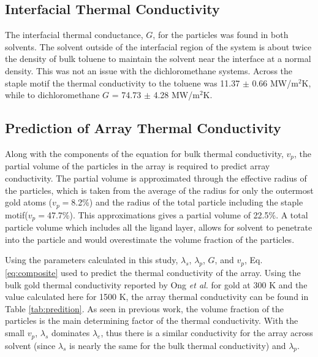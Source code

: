 \subsection{Interfacial Thermal Conductivity}
The interfacial thermal conductance, $G$, for the particles was found in both solvents.
The solvent outside of the interfacial region of the system is about twice the density of bulk toluene to maintain the solvent near the interface at a normal density.
This was not an issue with the dichloromethane systems. 
Across the staple motif the thermal conductivity to the toluene was 11.37 $\pm$ 0.66 MW/m$^2$K, while to dichloromethane $G$ = 74.73 $\pm$ 4.28 MW/m$^2$K.

\subsection{Prediction of Array Thermal Conductivity}
Along with the components of the equation for bulk thermal conductivity, $v_p$, the partial volume of the  particles in the array is required to predict array conductivity.
The partial volume is approximated through the effective radius of the particles, which is taken from the average of the radius for only the outermost gold atoms ($v_p=$8.2\%) and the radius of the total particle including the staple motif($v_p=$47.7\%).
This approximations gives a partial volume of 22.5\%.
A total particle volume which includes all the ligand layer, allows for solvent to penetrate into the particle and would overestimate the volume fraction of the particles. %

Using the parameters calculated in this study, $\lambda_s$, $\lambda_p$, $G$, and $v_p$, Eq.\ref{eq:composite} used to predict the thermal conductivity of the array.
Using the bulk gold thermal conductivity reported by Ong \textit{et al.} for gold at 300 K and the value calculated here for 1500 K, the array thermal conductivity can be found in Table \ref{tab:predition}.
As seen in previous work,\cite{Ong:2014yq, Liu2015, Zanjani2014} the volume fraction of the particles is the main determining factor of the thermal conductivity. 
With the small $v_p$, $\lambda_s$ dominates $\lambda_e$, thus there is a similar conductivity for the array across solvent (since $\lambda_s$ is nearly the same for the bulk thermal conductivity) and $\lambda_p$.

